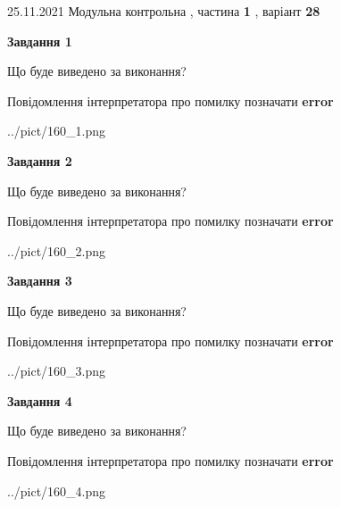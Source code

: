 \documentclass[10pt, ukrainian]{article}
\begin{document}
{25.11.2021 Модульна контрольна , частина \textbf { 1 }, варіант  \No \textbf { 28}\par}
{
\begin {large}

{\begin {center}\textbf{Завдання 1}\end {center}}\par
Що буде виведено за виконання? \par
Повідомлення інтерпретатора про помилку позначати \textbf{error}

\begin{center}
	{../pict/160_1.png}
\end{center}
\newpage

{\begin {center}\textbf{Завдання 2}\end {center}}\par
Що буде виведено за виконання? \par
Повідомлення інтерпретатора про помилку позначати \textbf{error}

\begin{center}
	{../pict/160_2.png}
\end{center}
\newpage

{\begin {center}\textbf{Завдання 3}\end {center}}\par
Що буде виведено за виконання? \par
Повідомлення інтерпретатора про помилку позначати \textbf{error}

\begin{center}
	{../pict/160_3.png}
\end{center}
\newpage

{\begin {center}\textbf{Завдання 4}\end {center}}\par
Що буде виведено за виконання? \par
Повідомлення інтерпретатора про помилку позначати \textbf{error}

\begin{center}
	{../pict/160_4.png}
\end{center}
\newpage


\end{large}}
\end{document}
